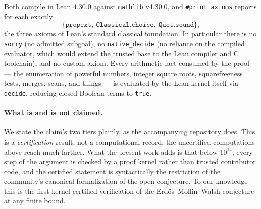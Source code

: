 \documentclass[11pt]{article}
\theoremstyle{definition}
\theoremstyle{remark}
\newcommand{\code}[1]{\texttt{#1}}
\begin{document}
Both compile in Lean 4.30.0 against \code{mathlib} v4.30.0, and
\code{\#print axioms} reports for each exactly
\[
  \{\code{propext},\ \code{Classical.choice},\ \code{Quot.sound}\},
\]
the three axioms of Lean's standard classical foundation. In particular
there is no \code{sorry} (no admitted subgoal), no \code{native\_decide}
(no reliance on the compiled evaluator, which would extend the trusted
base to the Lean compiler and C toolchain), and no custom axiom. Every
arithmetic fact consumed by the proof --- the enumeration of powerful
numbers, integer square roots, squarefreeness tests, merges, scans, and
tilings --- is evaluated by the Lean kernel itself via \code{decide},
reducing closed Boolean terms to \code{true}.

\paragraph{What is and is not claimed.}
We state the claim's two tiers plainly, as the accompanying repository
does. This is a \emph{certification} result, not a computational record:
the uncertified computations above reach much farther. What the present
work adds is that below $10^{14}$, every step of the argument is checked
by a proof kernel rather than trusted contributor code, and the certified
statement is syntactically the restriction of the community's canonical
formalization of the open conjecture. To our knowledge this is the first
kernel-certified verification of the Erd\H{o}s--Mollin--Walsh conjecture
at any finite bound.
\end{document}
